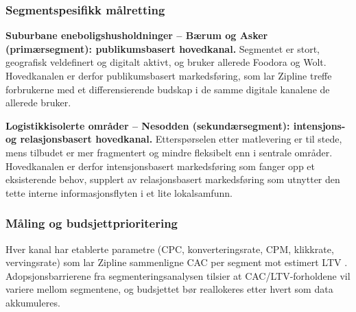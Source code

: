 \subsubsection{Segmentspesifikk målretting}

\textbf{Suburbane eneboligshusholdninger -- Bærum og Asker (primærsegment): publikumsbasert
hovedkanal.}
Segmentet er stort, geografisk veldefinert og digitalt aktivt, og bruker
allerede Foodora og Wolt. Hovedkanalen er derfor publikumsbasert
markedsføring, som lar Zipline treffe forbrukerne med et differensierende
budskap i de samme digitale kanalene de allerede bruker.

\textbf{Logistikkisolerte områder -- Nesodden (sekundærsegment): intensjons- og
relasjonsbasert hovedkanal.}
Etterspørselen etter matlevering er til stede, mens tilbudet er mer
fragmentert og mindre fleksibelt enn i sentrale områder.
Hovedkanalen er derfor intensjonsbasert markedsføring som fanger opp et
eksisterende behov, supplert av relasjonsbasert markedsføring som utnytter
den tette interne informasjonsflyten i et lite lokalsamfunn.


\subsubsection{Måling og budsjettprioritering}

Hver kanal har etablerte parametre (CPC, konverteringsrate, CPM,
klikkrate, vervingsrate) som lar Zipline sammenligne CAC per segment mot
estimert LTV \parencite[jf.][]{pfeifer2005}. Adopsjonsbarrierene fra
segmenteringsanalysen tilsier at CAC/LTV-forholdene vil variere mellom
segmentene, og budsjettet bør reallokeres etter hvert som data
akkumuleres.
